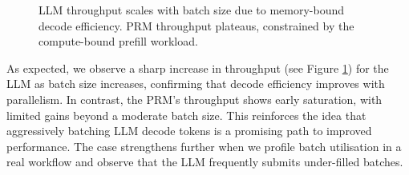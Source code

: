 \documentclass[12pt,twoside]{report}
\begin{document}
\begin{figure}[htbp]
\centering
{}
\hfill
{}
\caption{LLM throughput scales with batch size due to memory-bound decode efficiency. PRM throughput plateaus, constrained by the compute-bound prefill workload.}
\label{fig:prm_throughput_vs_llm_throughput}
\end{figure}

As expected, we observe a sharp increase in throughput (see Figure \ref{fig:prm_throughput_vs_llm_throughput}) for the LLM as batch size increases, confirming that decode efficiency improves with parallelism. 
In contrast, the PRM's throughput shows early saturation, with limited gains beyond a moderate batch size. 
This reinforces the idea that aggressively batching LLM decode tokens is a promising path to improved performance. 
The case strengthens further when we profile batch utilisation in a real workflow and observe that the LLM frequently submits under-filled batches.
\end{document}

